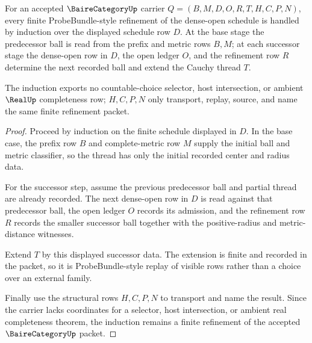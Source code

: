 \begin{theorem}
\label{thm:baire-category-probebundle-refinement-induction}
For an accepted $\BaireCategoryUp$ carrier $Q=(B,M,D,O,R,T,H,C,P,N)$, every finite ProbeBundle-style refinement of the dense-open schedule is handled by induction over the displayed schedule row $D$. At the base stage the predecessor ball is read from the prefix and metric rows $B,M$; at each successor stage the dense-open row in $D$, the open ledger $O$, and the refinement row $R$ determine the next recorded ball and extend the Cauchy thread $T$.

The induction exports no countable-choice selector, host intersection, or ambient $\RealUp$ completeness row; $H,C,P,N$ only transport, replay, source, and name the same finite refinement packet.
\end{theorem}
\begin{proof}
Proceed by induction on the finite schedule displayed in $D$. In the base case, the prefix row $B$ and complete-metric row $M$ supply the initial ball and metric classifier, so the thread has only the initial recorded center and radius data.

For the successor step, assume the previous predecessor ball and partial thread are already recorded. The next dense-open row in $D$ is read against that predecessor ball, the open ledger $O$ records its admission, and the refinement row $R$ records the smaller successor ball together with the positive-radius and metric-distance witnesses.

Extend $T$ by this displayed successor data. The extension is finite and recorded in the packet, so it is ProbeBundle-style replay of visible rows rather than a choice over an external family.

Finally use the structural rows $H,C,P,N$ to transport and name the result. Since the carrier lacks coordinates for a selector, host intersection, or ambient real completeness theorem, the induction remains a finite refinement of the accepted $\BaireCategoryUp$ packet.
\end{proof}

